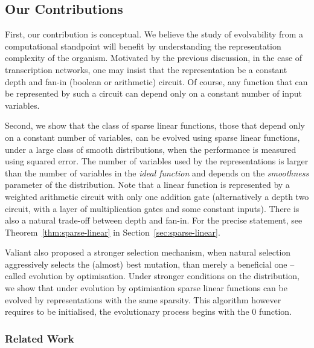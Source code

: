 
\subsection{Our Contributions}

First, our contribution is conceptual. We believe the study of evolvability from
a computational standpoint will benefit by understanding the representation
complexity of the organism. Motivated by the previous discussion, in the case of
transcription networks, one may insist that the representation be a
constant depth and fan-in (boolean or arithmetic) circuit. Of course, any
function that can be represented by such a circuit can depend only on a constant
number of input variables.

Second, we show that the class of sparse linear functions, those that depend
only on a constant number of variables, can be evolved using sparse linear
functions, under a large class of smooth distributions, when the performance is
measured using squared error. The number of variables used by the
representations is larger than the number of variables in the \emph{ideal
function} and depends on the \emph{smoothness} parameter of the distribution.
Note that a linear function is represented by a weighted arithmetic circuit with
only one addition gate (alternatively a depth two circuit, with a layer of
multiplication gates and some constant inputs). There is also a natural
trade-off between depth and fan-in. For the precise statement, see
Theorem~\ref{thm:sparse-linear} in Section~\ref{sec:sparse-linear}.

Valiant also proposed a stronger selection mechanism, when natural selection
aggressively selects the (almost) best mutation, than merely a beneficial one --
called evolution by optimisation.  Under stronger conditions on the
distribution, we show that under evolution by optimisation sparse linear
functions can be evolved by representations with the same sparsity. This
algorithm however requires to be initialised, \ie the evolutionary process
begins with the $0$ function.

\subsubsection*{Related Work}

